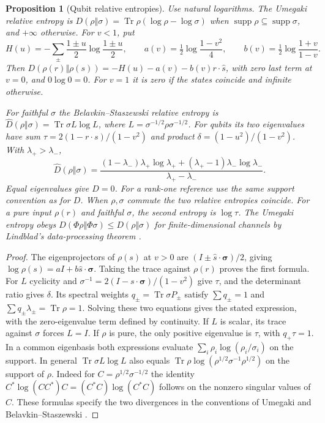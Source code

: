 \documentclass[aps,pra,onecolumn,superscriptaddress,nofootinbib,10pt]{revtex4-2}
\newtheorem{proposition}[theorem]{Proposition}
\theoremstyle{definition}
\theoremstyle{remark}
\newcommand{\tr}{\operatorname{Tr}}
\begin{document}
\begin{proposition}[Qubit relative entropies]\label{ob:relative}
Use natural logarithms. The Umegaki relative entropy is
\(D(\rho\Vert\sigma)=\tr\rho(\log\rho-\log\sigma)\) when
\(\operatorname{supp}\rho\subseteq\operatorname{supp}\sigma\), and
\(+\infty\) otherwise. For \(v<1\), put
\[
 H(u)=-\sum_{\pm}\frac{1\pm u}{2}\log\frac{1\pm u}{2},\qquad
 a(v)=\tfrac12\log\frac{1-v^2}{4},\qquad
 b(v)=\tfrac12\log\frac{1+v}{1-v}.
\]
Then \(D(\rho(r)\Vert\rho(s))=-H(u)-a(v)-b(v)r\cdot\widehat s\),
with zero last term at \(v=0\), and \(0\log0=0\). For \(v=1\) it is
zero if the states coincide and infinite otherwise.

For faithful \(\sigma\) the Belavkin--Staszewski relative entropy is
\(\widehat D(\rho\Vert\sigma)=\tr\sigma L\log L\), where
\(L=\sigma^{-1/2}\rho\sigma^{-1/2}\). For qubits its two eigenvalues have
sum \(\tau=2(1-r\cdot s)/(1-v^2)\) and product
\(\delta=(1-u^2)/(1-v^2)\). With \(\lambda_+>\lambda_-\),
\[
 \widehat D(\rho\Vert\sigma)=
 \frac{(1-\lambda_-)\lambda_+\log\lambda_+
          +(\lambda_+-1)\lambda_-\log\lambda_-}
      {\lambda_+-\lambda_-}.
\]
Equal eigenvalues give \(\widehat D=0\). For a rank-one reference use the
same support convention as for \(D\). When \(\rho,\sigma\) commute the
two relative entropies coincide. For a pure input \(\rho(r)\) and
faithful \(\sigma\), the second entropy is \(\log\tau\). The Umegaki
entropy obeys \(D(\Phi\rho\Vert\Phi\sigma)\le D(\rho\Vert\sigma)\) for
finite-dimensional channels by Lindblad's data-processing theorem
\cite[Theorem~1]{n2-lindblad}.
\end{proposition}
\begin{proof}
The eigenprojectors of \(\rho(s)\) at \(v>0\) are
\((I\pm\widehat s\cdot\boldsymbol{\sigma})/2\), giving
\(\log\rho(s)=aI+b\widehat s\cdot\boldsymbol{\sigma}\).
Taking the trace against \(\rho(r)\) proves the first formula.
For \(L\) cyclicity and \(\sigma^{-1}=2(I-s\cdot
\boldsymbol{\sigma})/(1-v^2)\) give \(\tau\), and the determinant ratio
gives \(\delta\). Its spectral weights \(q_\pm=\tr\sigma P_\pm\)
satisfy \(\sum q_\pm=1\) and \(\sum q_\pm\lambda_\pm=\tr\rho=1\).
Solving these two equations gives the stated expression, with the
zero-eigenvalue term defined by continuity. If \(L\) is scalar, its
trace against \(\sigma\) forces \(L=I\). If \(\rho\) is pure, the only
positive eigenvalue is \(\tau\), with \(q_+\tau=1\).
In a common eigenbasis both expressions evaluate
\(\sum_i \rho_i\log(\rho_i/\sigma_i)\) on the support.
In general \(\tr\sigma L\log L\) also equals
\(\tr\rho\log(\rho^{1/2}\sigma^{-1}\rho^{1/2})\) on the support
of \(\rho\). Indeed for \(C=\rho^{1/2}\sigma^{-1/2}\) the identity
\(C^*\log(CC^*)C=(C^*C)\log(C^*C)\) follows on the nonzero
singular values of \(C\). These formulas specify the two divergences
in the conventions of Umegaki and Belavkin--Staszewski
\cite{obr:umegaki,obr:bs}.
\end{proof}
\end{document}
